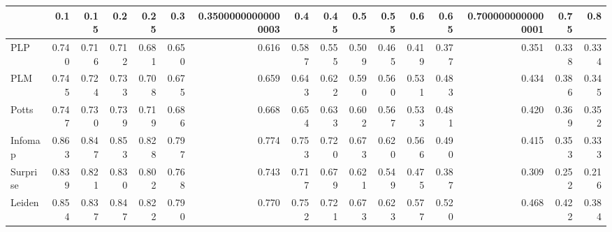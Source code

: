 \begin{tabular}{lrrrrrrrrrrrrrrr}
\toprule
{} &   0.1 &  0.15 &   0.2 &  0.25 &   0.3 & 0.35000000000000003 &   0.4 &  0.45 &   0.5 &  0.55 &   0.6 &  0.65 & 0.7000000000000001 &  0.75 &   0.8 \\
\midrule
PLP      & 0.740 & 0.716 & 0.712 & 0.681 & 0.650 &               0.616 & 0.587 & 0.555 & 0.509 & 0.465 & 0.419 & 0.377 &              0.351 & 0.338 & 0.334 \\
PLM      & 0.745 & 0.724 & 0.733 & 0.708 & 0.675 &               0.659 & 0.643 & 0.622 & 0.590 & 0.560 & 0.531 & 0.483 &              0.434 & 0.386 & 0.345 \\
Potts    & 0.747 & 0.730 & 0.739 & 0.719 & 0.686 &               0.668 & 0.654 & 0.633 & 0.602 & 0.567 & 0.533 & 0.481 &              0.420 & 0.369 & 0.352 \\
Infomap  & 0.863 & 0.847 & 0.853 & 0.828 & 0.797 &               0.774 & 0.753 & 0.720 & 0.673 & 0.620 & 0.566 & 0.490 &              0.415 & 0.353 & 0.333 \\
Surprise & 0.839 & 0.821 & 0.830 & 0.802 & 0.768 &               0.743 & 0.717 & 0.679 & 0.621 & 0.549 & 0.475 & 0.387 &              0.309 & 0.252 & 0.216 \\
Leiden   & 0.854 & 0.837 & 0.847 & 0.822 & 0.790 &               0.770 & 0.752 & 0.721 & 0.673 & 0.623 & 0.577 & 0.520 &              0.468 & 0.422 & 0.384 \\
\bottomrule
\end{tabular}
